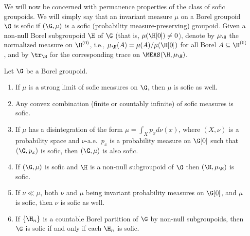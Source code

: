 We will now be concerned with permanence properties of the class of sofic groupoids. We will simply say that an invariant measure $\mu$ on a Borel groupoid $\G$ is sofic if $(\G,\mu)$ is a sofic (probability measure-preserving) groupoid. Given a non-null Borel subgroupoid $\H$ of $\G$ (that is, $\mu(\H[0])\neq 0$), denote by $\mu_{\H}$ the normalized measure on $\H^{(0)}$, i.e., $\mu_{\H}(A)=\mu(A)/\mu(\H[0])$ for all Borel $A\subseteq\H^{(0)}$, and by $\tr_{\H}$ for the corresponding trace on $\MEAS(\H,\mu_{\H})$.

\begin{theorem}\label{theorempermanencesofic}
Let $\G$ be a Borel groupoid.
\begin{enumerate}
\item[(a)] If $\mu$ is a strong limit of sofic measures on $\G$, then $\mu$ is sofic as well.
\item[(b)] Any convex combination (finite or countably infinite) of sofic measures is sofic.
\item[(c)] If $\mu$ has a disintegration of the form $\mu=\int_X p_xd\nu(x)$, where $(X,\nu)$ is a probability space and $\nu$-a.e.\ $p_x$ is a probability measure on $\G[0]$ such that $(\G,p_x)$ is sofic, then $(\G,\mu)$ is also sofic.
\item[(d)]\label{theorempermanenceitemsubgroupoid} If $(\G,\mu)$ is sofic and $\H$ is a non-null subgroupoid of $\G$ then $(\H,\mu_{\H})$ is sofic.
\item[(e)] If $\nu\ll\mu$, both $\nu$ and $\mu$ being invariant probability measures on $\G[0]$, and $\mu$ is sofic, then $\nu$ is sofic as well.
\item[(f)] If $\left\{\H_n\right\}$ is a countable Borel partition of $\G$ by non-null subgroupoids, then $\G$ is sofic if and only if each $\H_n$ is sofic.
\end{enumerate}
\end{theorem}


